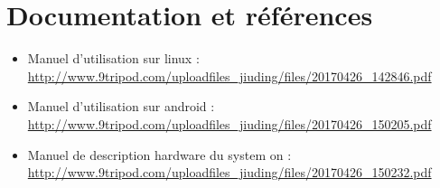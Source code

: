 \section{Documentation et références}

\vspace{4mm}

\begin{itemize}

  \item Manuel d'utilisation sur linux :
    \newline
    \url{http://www.9tripod.com/uploadfiles_jiuding/files/20170426_142846.pdf}
    \newline

  \item Manuel d'utilisation sur android :
    \newline
    \url{http://www.9tripod.com/uploadfiles_jiuding/files/20170426_150205.pdf}
    \newline

  \item Manuel de description hardware du system on :
    \newline
    \url{http://www.9tripod.com/uploadfiles_jiuding/files/20170426_150232.pdf}
    \newline

\end{itemize}

\newpage
